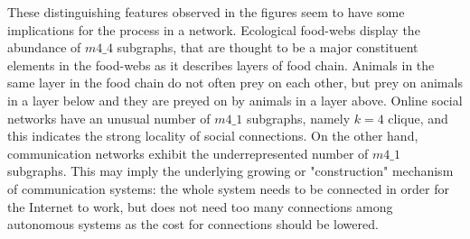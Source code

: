 \documentclass{article}
\begin{document}
These distinguishing features observed in the figures seem to have some implications for the process in a network. Ecological food-webs display the abundance of $m4\_4$ subgraphs, that are thought to be a major constituent elements in the food-webs as it describes layers of food chain. Animals in the same layer in the food chain do not often prey on each other, but prey on animals in a layer below and they are preyed on by animals in a layer above. Online social networks have an unusual number of $m4\_1$ subgraphs, namely $k = 4$ clique, and this indicates the strong locality of social connections. On the other hand, communication networks exhibit the underrepresented number of  $m4\_1$ subgraphs. This may imply the underlying growing or "construction" mechanism of communication systems: the whole system needs to be connected in order for the Internet to work, but does not need too many connections among autonomous systems as the cost for connections should be lowered.

 
\end{document}
